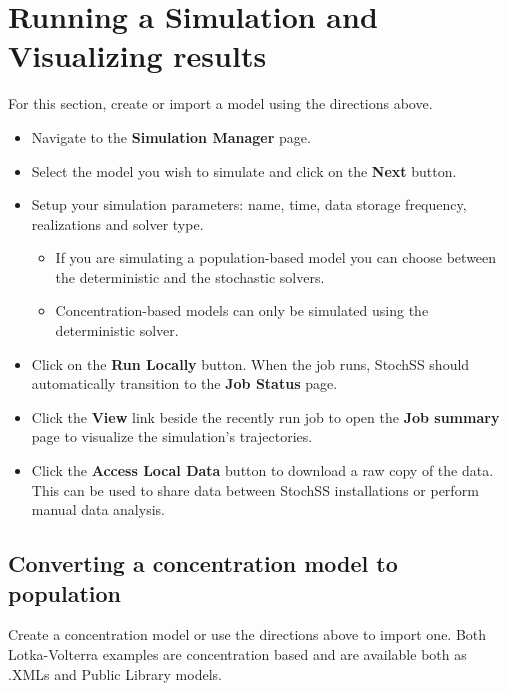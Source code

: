 \section{Running a Simulation and Visualizing results}

For this section, create or import a model using the directions above.

\begin{itemize}
  \item Navigate to the \textbf{Simulation Manager} page.
  \item Select the model you wish to simulate and click on the \textbf{Next} button.
  \item Setup your simulation parameters: name, time, data storage frequency, realizations and solver type. 
  \begin{itemize}
    \item If you are simulating a population-based model you can choose between the deterministic and the stochastic solvers.
    \item Concentration-based models can only be simulated using the deterministic solver.
  \end{itemize}  
  \item Click on the \textbf{Run Locally} button. When the job runs, StochSS should automatically transition to the \textbf{Job Status} page.
  \item Click the \textbf{View} link beside the recently run job to open the \textbf{Job summary} page to visualize the simulation's trajectories.
  \item Click the \textbf{Access Local Data} button to download a raw copy of the data. This can be used to share data between StochSS installations or perform manual data analysis.
\end{itemize}

\subsection{Converting a concentration model to population}
Create a concentration model or use the directions above to import one. Both Lotka-Volterra examples are concentration based and are available both as .XMLs and Public Library models.

